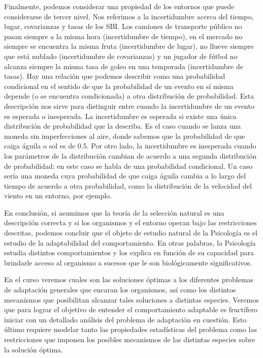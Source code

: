 \documentclass[
  letterpaper,
]{book}
\begin{document}
Finalmente, podemos considerar una propiedad de los entornos que puede
considerarse de tercer nivel. Nos referimos a la incertidumbre acerca
del tiempo, lugar, covarianzas y tasas de los SBI. Los camiones de
transporte público no pasan siempre a la misma hora (incertidumbre de
tiempo), en el mercado no siempre se encuentra la misma fruta
(incertidumbre de lugar), no llueve siempre que está nublado
(incertidumbre de covarianzas) y un jugador de fútbol no alcanza siempre
la misma tasa de goleo en una temporada (incertidumbre de tasas). Hay
una relación que podemos describir como una probabilidad condicional en
el sentido de que la probabilidad de un evento en sí misma depende (o se
encuentra condicionada) a otra distribución de probabilidad. Esta
descripción nos sirve para distinguir entre cuando la incertidumbre de
un evento es esperada o inesperada. La incertidumbre es esperada si
existe una única distribución de probabilidad que la describa. Es el
caso cuando se lanza una moneda sin imperfecciones al aire, donde
sabemos que la probabilidad de que caiga águila o sol es de 0.5. Por
otro lado, la incertidumbre es inesperada cuando los parámetros de la
distribución cambian de acuerdo a una segunda distribución de
probabilidad: en este caso se habla de una probabilidad condicional. Un
caso sería una moneda cuya probabilidad de que caiga águila cambia a lo
largo del tiempo de acuerdo a otra probabilidad, como la distribución de
la velocidad del viento en un entorno, por ejemplo.

En conclusión, si asumimos que la teoría de la selección natural es una
descripción correcta y si los organismos y el entorno operan bajo las
restricciones descritas, podemos concluir que el objeto de estudio
natural de la Psicología es el estudio de la adaptabilidad del
comportamiento. En otras palabras, la Psicología estudia distintos
comportamientos y los explica en función de su capacidad para brindarle
acceso al organismo a sucesos que le son biológicamente significativos.

En el curso veremos cuales son las soluciones óptimas a los diferentes
problemas de adaptación generales que encaran los organismos, así como
los distintos mecanismos que posibilitan alcanzar tales soluciones a
distintas especies. Veremos que para lograr el objetivo de entender el
comportamiento adaptable es fructífero iniciar con un detallado análisis
del problema de adaptación en cuestión. Esto último requiere modelar
tanto las propiedades estadísticas del problema como las restricciones
que imponen los posibles mecanismos de las distintas especies sobre la
solución óptima.
\end{document}
